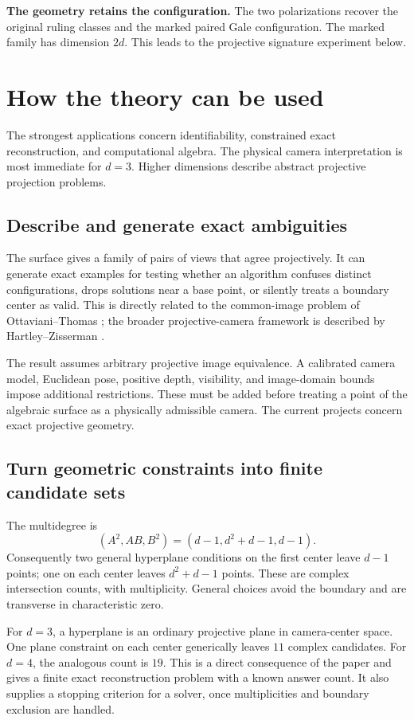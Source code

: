 \documentclass[11pt]{article}
\begin{document}
\textbf{The geometry retains the configuration.} The two polarizations recover the original ruling classes and the marked paired Gale configuration. The marked family has dimension $2d$. This leads to the projective signature experiment below.

\section{How the theory can be used}
The strongest applications concern identifiability, constrained exact reconstruction, and computational algebra. The physical camera interpretation is most immediate for $d=3$. Higher dimensions describe abstract projective projection problems.

\subsection{Describe and generate exact ambiguities}
The surface gives a family of pairs of views that agree projectively. It can generate exact examples for testing whether an algorithm confuses distinct configurations, drops solutions near a base point, or silently treats a boundary center as valid. This is directly related to the common-image problem of Ottaviani--Thomas \cite{OT}; the broader projective-camera framework is described by Hartley--Zisserman \cite{HZ}.

The result assumes arbitrary projective image equivalence. A calibrated camera model, Euclidean pose, positive depth, visibility, and image-domain bounds impose additional restrictions. These must be added before treating a point of the algebraic surface as a physically admissible camera. The current projects concern exact projective geometry.

\subsection{Turn geometric constraints into finite candidate sets}
The multidegree is
\[
(A^2,AB,B^2)=(d-1,d^2+d-1,d-1).
\]
Consequently two general hyperplane conditions on the first center leave $d-1$ points; one on each center leaves $d^2+d-1$ points. These are complex intersection counts, with multiplicity. General choices avoid the boundary and are transverse in characteristic zero.

For $d=3$, a hyperplane is an ordinary projective plane in camera-center space. One plane constraint on each center generically leaves $11$ complex candidates. For $d=4$, the analogous count is $19$. This is a direct consequence of the paper and gives a finite exact reconstruction problem with a known answer count. It also supplies a stopping criterion for a solver, once multiplicities and boundary exclusion are handled.
\end{document}
